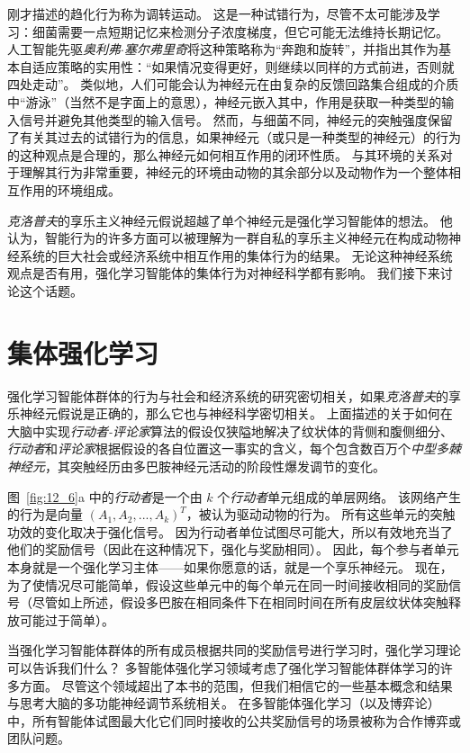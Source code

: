 刚才描述的趋化行为称为调转运动。
这是一种试错行为，尽管不太可能涉及学习：细菌需要一点短期记忆来检测分子浓度梯度，但它可能无法维持长期记忆。
人工智能先驱\textit{奥利弗$\cdot$塞尔弗里奇}将这种策略称为“奔跑和旋转”，并指出其作为基本自适应策略的实用性：“如果情况变得更好，则继续以同样的方式前进，否则就四处走动”\cite{selfridge1978tracking,selfridge1984some}。
类似地，人们可能会认为神经元在由复杂的反馈回路集合组成的介质中“游泳”（当然不是字面上的意思），神经元嵌入其中，作用是获取一种类型的输入信号并避免其他类型的输入信号。
然而，与细菌不同，神经元的突触强度保留了有关其过去的试错行为的信息，如果神经元（或只是一种类型的神经元）的行为的这种观点是合理的，那么神经元如何相互作用的闭环性质。
与其环境的关系对于理解其行为非常重要，神经元的环境由动物的其余部分以及动物作为一个整体相互作用的环境组成。


\textit{克洛普夫}的享乐主义神经元假说超越了单个神经元是强化学习智能体的想法。
他认为，智能行为的许多方面可以被理解为一群自私的享乐主义神经元在构成动物神经系统的巨大社会或经济系统中相互作用的集体行为的结果。
无论这种神经系统观点是否有用，强化学习智能体的集体行为对神经科学都有影响。
我们接下来讨论这个话题。


\section{集体强化学习} \label{sec:collective_rl}

强化学习智能体群体的行为与社会和经济系统的研究密切相关，如果\textit{克洛普夫}的享乐神经元假说是正确的，那么它也与神经科学密切相关。
上面描述的关于如何在大脑中实现\textit{行动者-评论家}算法的假设仅狭隘地解决了纹状体的背侧和腹侧细分、\textit{行动者}和\textit{评论家}根据假设的各自位置这一事实的含义，每个包含数百万个\textit{中型多棘神经元}，其突触经历由多巴胺神经元活动的阶段性爆发调节的变化。


图~\ref{fig:12_6}a 中的\textit{行动者}是一个由 $k$ 个\textit{行动者}单元组成的单层网络。
该网络产生的行为是向量 $(A_1, A_2, ..., A_k) ^T$，被认为驱动动物的行为。
所有这些单元的突触功效的变化取决于强化信号。
因为行动者单位试图尽可能大，所以有效地充当了他们的奖励信号（因此在这种情况下，强化与奖励相同）。
因此，每个参与者单元本身就是一个强化学习主体——如果你愿意的话，就是一个享乐神经元。
现在，为了使情况尽可能简单，假设这些单元中的每个单元在同一时间接收相同的奖励信号（尽管如上所述，假设多巴胺在相同条件下在相同时间在所有皮层纹状体突触释放可能过于简单）。


当强化学习智能体群体的所有成员根据共同的奖励信号进行学习时，强化学习理论可以告诉我们什么？
多智能体强化学习领域考虑了强化学习智能体群体学习的许多方面。
尽管这个领域超出了本书的范围，但我们相信它的一些基本概念和结果与思考大脑的多功能神经调节系统相关。
在多智能体强化学习（以及博弈论）中，所有智能体试图最大化它们同时接收的公共奖励信号的场景被称为合作博弈或团队问题。


